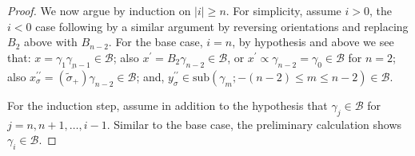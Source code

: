 \documentclass[10pt,a4paper]{amsart}
\renewcommand{\bar}{\overline}
\newcommand{\basgen}{\mcal{B}}
\newcommand{\lift}[1]{\tilde{#1}}
\newcommand{\lp}{\left(}\newcommand{\rp}{\right)}
\newcommand{\mcal}[1]{\mathcal{#1}}
\newcommand{\mrm}[1]{\mathrm{#1}}
\newcommand{\rev}[1]{\bar{#1}}
\newcommand{\sub}[1]{\mrm{sub}\lp#1\rp}
\renewcommand{\tilde}{\widetilde}
\begin{document}
\begin{proof}
We now argue by induction on $|i|\geq n$.  For simplicity, assume $i>0$, the $i<0$ case following by a similar argument by reversing orientations and replacing $B_2$ above with $B_{n-2}$.  For the base case, $i=n$, by hypothesis and above we see that: $x=\gamma_1\gamma_{n-1}\in\basgen$; also $x^\prime=B_2\gamma_{n-2}\in\basgen$, or $x^\prime\propto\gamma_{n-2}=\gamma_0\in\basgen$ for $n=2$; also $x^{\prime\prime}_\sigma=\rev{\lp\lift{\sigma}_+\rp}\gamma_{n-2}\in\basgen$; and, $y^{\prime\prime}_\sigma\in\sub{\gamma_m;-(n-2)\leq m\leq n-2}\in\basgen$.  

For the induction step, assume in addition to the hypothesis that $\gamma_j\in\basgen$ for $j=n,n+1,\dots,i-1$. Similar to the base case, the preliminary calculation shows $\gamma_{i}\in\basgen$.  \end{proof}
\end{document}
